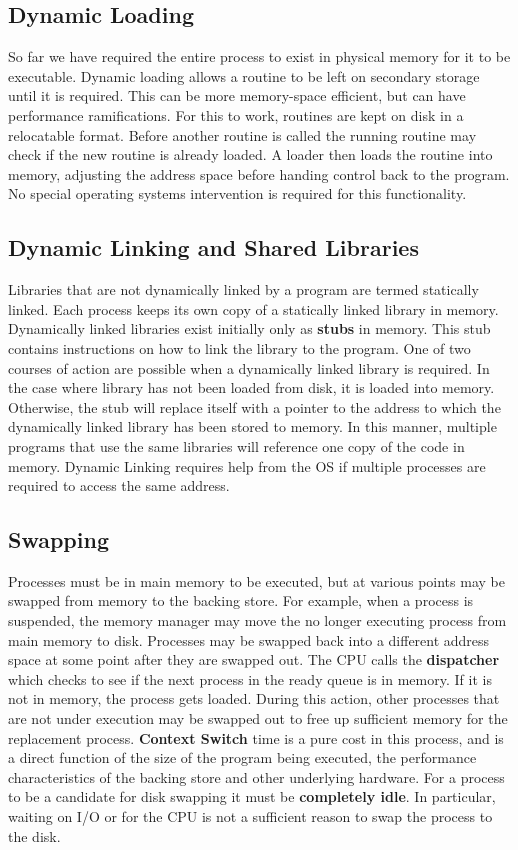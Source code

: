 \documentclass[10pt,a4paper]{article}
\begin{document}
\subsection{Dynamic Loading}
So far we have required the entire process to exist in physical memory for it to be executable. Dynamic loading allows a routine to be left on secondary storage until it is required. This can be more memory-space efficient, but can have performance ramifications. For this to work, routines are kept on disk in a relocatable format. Before another routine is called the running routine may check if the new routine is already loaded. A loader then loads the routine into memory, adjusting the address space before handing control back to the program. No special operating systems intervention is required for this functionality. 
\subsection{Dynamic Linking and Shared Libraries}
Libraries that are not dynamically linked by a program are termed statically linked. Each process keeps its own copy of a statically linked library in memory. Dynamically linked libraries exist initially only as {\bf stubs} in memory. This stub contains instructions on how to link the library to the program. One of two courses of action are possible when a dynamically linked library is required. In the case where library has not been loaded from disk, it is loaded into memory. Otherwise, the stub will replace itself with a pointer to the address to which the dynamically linked library has been stored to memory. In this manner, multiple programs that use the same libraries will reference one copy of the code in memory. Dynamic Linking requires help from the OS if multiple processes are required to access the same address. 
\subsection{Swapping}
Processes must be in main memory to be executed, but at various points may be swapped from memory to the backing store. For example, when a process is suspended, the memory manager may move the no longer executing process from main memory to disk. Processes may be swapped back into a different address space at some point after they are swapped out. The CPU calls the {\bf dispatcher} which checks to see if the next process in the ready queue is in memory. If it is not in memory, the process gets loaded. During this action, other processes that are not under execution may be swapped out to free up sufficient memory for the replacement process. {\bf Context Switch} time is a pure cost in this process, and is a direct function of the size of the program being executed, the performance characteristics of the backing store and other underlying hardware. For a process to be a candidate for disk swapping it must be {\bf completely idle}. In particular, waiting on I/O or for the CPU is not a sufficient reason to swap the process to the disk. 
\end{document}
